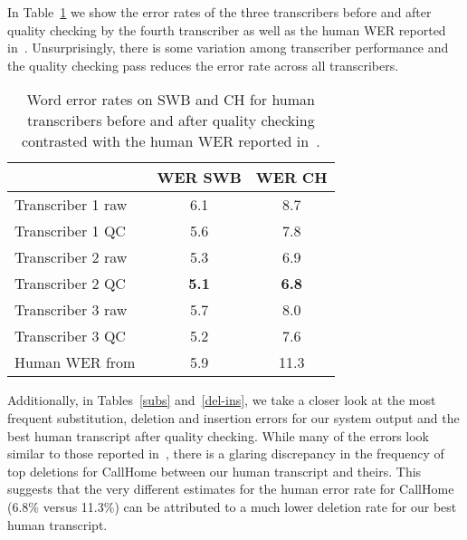 \documentclass[a4paper]{article}
\begin{document}
In Table~\ref{human-wer} we show the error rates of the three
transcribers before and after quality checking by the fourth
transcriber as well as the human WER reported in~\cite{xiong16}. Unsurprisingly, there is some variation among
transcriber performance and the quality checking pass reduces the error rate
across all transcribers. 

\begin{table}[htpb!]
\begin{center}
\begin{tabular}{|l|c|c|} \hline
                    & WER SWB & WER CH      \\ \hline
Transcriber 1 raw & 6.1 & 8.7        \\
Transcriber 1 QC & 5.6 & 7.8 \\ \hline
Transcriber 2 raw & 5.3 & 6.9        \\
Transcriber 2 QC & {\bf 5.1} & {\bf 6.8} \\ \hline
Transcriber 3 raw & 5.7 & 8.0        \\
Transcriber 3 QC & 5.2 & 7.6 \\ \hline\hline
Human WER from~\cite{xiong16} & 5.9 & 11.3\\ \hline
\end{tabular}
\end{center}
\caption{\label{human-wer}
Word error rates on SWB and CH for human transcribers before and after quality checking contrasted with the human WER reported in~\cite{xiong16}.}
\end{table}

Additionally, in Tables~\ref{subs} and~\ref{del-ins}, we take a closer look
at the most frequent substitution, deletion and insertion errors for
our system output and the best human transcript after quality
checking.  While many of the errors look similar to those reported
in~\cite{xiong16}, there is a glaring discrepancy in the frequency of
top deletions for CallHome between our human transcript and theirs.
This suggests that the very different estimates for the human error
rate for CallHome (6.8\% versus 11.3\%) can be attributed to a much
lower deletion rate for our best human transcript.
\end{document}
